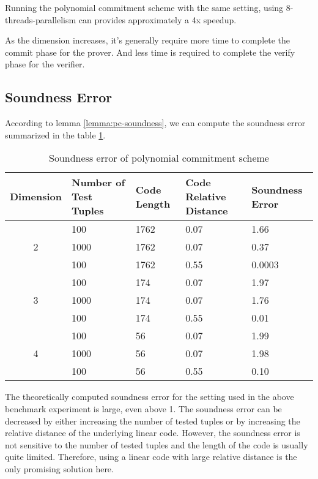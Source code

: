 Running the polynomial commitment scheme with the same setting, using 8-threads-parallelism can provides approximately a 4x speedup.

As the dimension increases, it's generally require more time to complete the commit phase for the prover. And less time is required to complete the verify phase for the verifier.

\subsection{Soundness Error}

According to lemma \ref{lemma:pc-soundness}, we can compute the soundness error summarized in the table \ref{table:benchmark-pc-3}.

\begin{table}[h!]
\centering
\begin{tabular}{| c | m{5em} | m{5em} | m{5em}  | m{5em}|} 
 \hline
 Dimension & Number of Test Tuples & Code Length & Code Relative Distance & Soundness Error \\ [0.5ex] 
 \hline\hline
 
 \multirow{3}{*}{2} & 100 & 1762 & 0.07 & 1.66  \\
  & 1000 & 1762 & 0.07 & 0.37  \\
  & 100 & 1762 & 0.55 & 0.0003  \\
 \hline
 
 \multirow{3}{*}{3} & 100 & 174  & 0.07 & 1.97 \\
 & 1000 & 174  & 0.07 & 1.76 \\
 & 100 & 174  & 0.55 & 0.01 \\
 \hline
 
 \multirow{3}{*}{4} & 100 & 56   & 0.07 & 1.99  \\
  & 1000 & 56   & 0.07 & 1.98  \\
  & 100 & 56   & 0.55 & 0.10  \\ 
 \hline
\end{tabular}
\caption{Soundness error of polynomial commitment scheme}
\label{table:benchmark-pc-3}
\end{table}

The theoretically computed soundness error for the setting used in the above benchmark experiment is large, even above 1. The soundness error can be decreased by either increasing the number of tested tuples or by increasing the relative distance of the underlying linear code. However, the soundness error is not sensitive to the number of tested tuples and the length of the code is usually quite limited. Therefore, using a linear code with large relative distance is the only promising solution here.